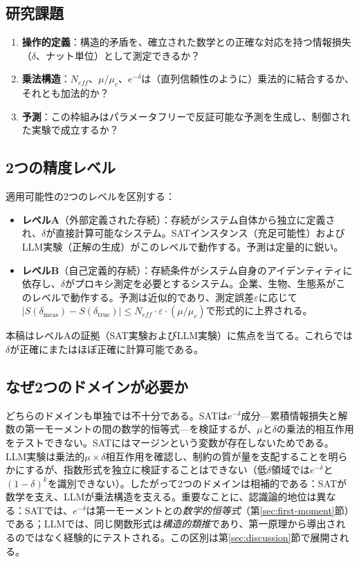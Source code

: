 \documentclass[11pt,a4paper]{article}
\begin{document}
\subsection{研究課題}

\begin{enumerate}
    \item \textbf{操作的定義}：構造的矛盾を、確立された数学との正確な対応を持つ情報損失（$\delta$、ナット単位）として測定できるか？
    \item \textbf{乗法構造}：$N_{eff}$、$\mu/\mu_c$、$e^{-\delta}$は（直列信頼性のように）乗法的に結合するか、それとも加法的か？
    \item \textbf{予測}：この枠組みはパラメータフリーで反証可能な予測を生成し、制御された実験で成立するか？
\end{enumerate}

\subsection{2つの精度レベル}

適用可能性の2つのレベルを区別する：

\begin{itemize}
    \item \textbf{レベルA}（外部定義された存続）：存続がシステム自体から独立に定義され、$\delta$が直接計算可能なシステム。SATインスタンス（充足可能性）およびLLM実験（正解の生成）がこのレベルで動作する。予測は定量的に鋭い。

    \item \textbf{レベルB}（自己定義的存続）：存続条件がシステム自身のアイデンティティに依存し、$\delta$がプロキシ測定を必要とするシステム。企業、生物、生態系がこのレベルで動作する。予測は近似的であり、測定誤差$\varepsilon$に応じて$|S(\delta_{\text{meas}}) - S(\delta_{\text{true}})| \leq N_{eff} \cdot \varepsilon \cdot (\mu/\mu_c)$で形式的に上界される。
\end{itemize}

本稿はレベルAの証拠（SAT実験およびLLM実験）に焦点を当てる。これらでは$\delta$が正確にまたはほぼ正確に計算可能である。

\subsection{なぜ2つのドメインが必要か}

どちらのドメインも単独では不十分である。SATは$e^{-\delta}$成分---累積情報損失と解数の第一モーメントの間の数学的恒等式---を検証するが、$\mu$と$\delta$の乗法的相互作用をテストできない。SATにはマージンという変数が存在しないためである。LLM実験は乗法的$\mu \times \delta$相互作用を確認し、制約の質が量を支配することを明らかにするが、指数形式を独立に検証することはできない（低$\delta$領域では$e^{-\delta}$と$(1-\delta)^k$を識別できない）。したがって2つのドメインは相補的である：SATが数学を支え、LLMが乗法構造を支える。重要なことに、認識論的地位は異なる：SATでは、$e^{-\delta}$は第一モーメントとの\emph{数学的恒等式}（第\ref{sec:first-moment}節）である；LLMでは、同じ関数形式は\emph{構造的類推}であり、第一原理から導出されるのではなく経験的にテストされる。この区別は第\ref{sec:discussion}節で展開される。
\end{document}
